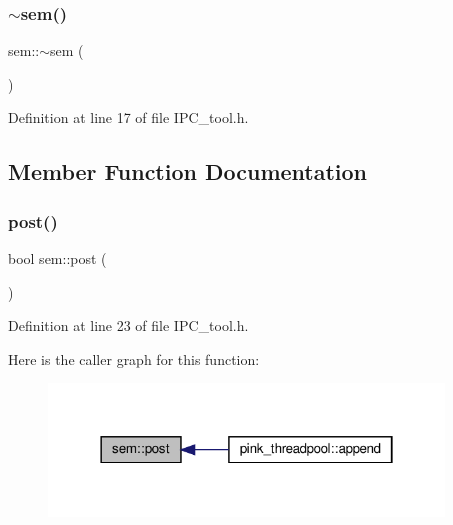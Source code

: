 \subsubsection{\texorpdfstring{$\sim$sem()}{~sem()}}
{\footnotesize\ttfamily sem\+::$\sim$sem (\begin{DoxyParamCaption}{ }\end{DoxyParamCaption})\hspace{0.3cm}{\ttfamily [inline]}}



Definition at line 17 of file I\+P\+C\+\_\+tool.\+h.



\subsection{Member Function Documentation}
\mbox{\label{classsem_a258d9983b317cba4b528f6204545f849}} 
\subsubsection{\texorpdfstring{post()}{post()}}
{\footnotesize\ttfamily bool sem\+::post (\begin{DoxyParamCaption}{ }\end{DoxyParamCaption})\hspace{0.3cm}{\ttfamily [inline]}}



Definition at line 23 of file I\+P\+C\+\_\+tool.\+h.

Here is the caller graph for this function\+:
\nopagebreak
\begin{figure}[H]
\begin{center}
\leavevmode
\includegraphics[width=298pt]{classsem_a258d9983b317cba4b528f6204545f849_icgraph}
\end{center}
\end{figure}
\mbox{\label{classsem_a0195e3b2273cb8d2c814778b0521e847}} 
